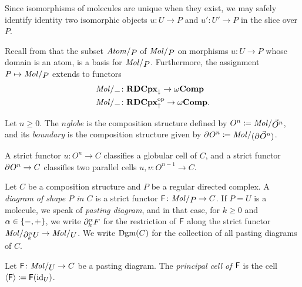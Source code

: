 \begin{rmk}
    Since isomorphisms of molecules are unique when they exist, we may safely identify identity two isomorphic objects \( u \colon U \to P \) and \( u' \colon U' \to P \) in the slice over \( P \).
\end{rmk}

\noindent Recall from \cite[Section 5.2, Section 6]{hadzihasanovic2024combinatorics} that the subset \( \atomin{P} \) of \( \molecin{P} \) on morphisms \( u \colon U \to P \) whose domain is an atom, is a basis for \( \molecin{P} \).
Furthermore, the assignment \( P \mapsto \molecin{P} \) extends to functors
\begin{align*}
    \molecin{-} &\colon \rdcpxmap \to \Comp \\
    \molecin{-} &\colon \opp{\rdcpxcomap} \to \Comp. \\    
\end{align*} 

\begin{dfn} [Globe]
    Let \( n \geq 0 \).
    The \emph{\( n \)\nbd globe} is the composition structure defined by \( \globe{n} \eqdef \molecin{\dglobe{n}} \), and its \emph{boundary} is the composition structure given by \( \bd{}{}\globe{n} \eqdef \molecin{(\bd{}{}\dglobe{n})} \).
\end{dfn}

\begin{rmk}
    A strict functor \( u \colon O^n \to C \) classifies a globular cell of \( C \), and a strict functor \( \partial_{}^{} O^n \to C \) classifies two parallel cells \( u, v \colon O^{n - 1} \to C \).
\end{rmk}

\begin{dfn} 
    Let \( C \) be a composition structure and \( P \) be a regular directed complex.
    A \emph{diagram of shape \( P \) in \( C \)} is a strict functor \( \F \colon \molecin{P} \to C \).
    If \( P = U \) is a molecule, we speak of \emph{pasting diagram}, and in that case, for \( k \geq 0 \) and \( \alpha \in \left\{ {-, +} \right\} \), we write \( \partial_{k}^{\alpha} F \) for the restriction of \( \mathsf{F} \) along the strict functor \( \molecin{\bd{k}{\a} U} \to \molecin{U} \).
    We write \( \operatorname{Dgm}(C) \) for the collection of all pasting diagrams of \( C \).
\end{dfn}

\begin{dfn} 
    Let \( \F \colon \molecin{U} \to C \) be a pasting diagram.
    The \emph{principal cell of \( \mathsf{F} \)} is the cell \( \langle\mathsf{F}\rangle \coloneqq \mathsf{F}(\mathrm{id}_{U}) \).
\end{dfn}

